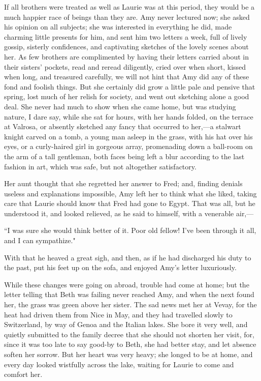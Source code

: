 If all brothers were treated as well as Laurie was at this period, they
would be a much happier race of beings than they are. Amy never lectured
now; she asked his opinion on all subjects; she was interested in
everything he did, made charming little presents for him, and sent him
two letters a week, full of lively gossip, sisterly confidences, and
captivating sketches of the lovely scenes about her. As few brothers are
complimented by having their letters carried about in their
sisters' pockets, read and reread diligently, cried
over when short, kissed when long, and treasured carefully, we will not
hint that Amy did any of these fond and foolish things. But she
certainly did grow a little pale and pensive that spring, lost much of
her relish for society, and went out sketching alone a good deal. She
never had much to show when she came home, but was studying nature, I
dare say, while she sat for hours, with her hands folded, on the terrace
at Valrosa, or absently sketched any fancy that occurred to her,---a
stalwart knight carved on a tomb, a young man asleep in the grass, with
his hat over his eyes, or a curly-haired girl in gorgeous array,
promenading down a ball-room on the arm of a tall gentleman, both faces
being left a blur according to the last fashion in art, which was safe,
but not altogether satisfactory.

Her aunt thought that she regretted her answer to Fred; and, finding
denials useless and explanations impossible, Amy left her to think what
she liked, taking care that Laurie should know that Fred had gone to
Egypt. That was all, but he understood it, and looked relieved, as he
said to himself, with a venerable air,---

``I was sure she would think better of it. Poor old fellow!
I've been through it all, and I can sympathize."

With that he heaved a great sigh, and then, as if he had discharged his
duty to the past, put his feet up on the sofa, and enjoyed
Amy's letter luxuriously.

While these changes were going on abroad, trouble had come at home; but
the letter telling that Beth was failing never reached Amy, and when the
next found her, the grass was green above her sister. The sad news met
her at Vevay, for the heat had driven them from Nice in May, and they
had travelled slowly to Switzerland, by way of Genoa and the Italian
lakes. She bore it very well, and quietly submitted to the family decree
that she should not shorten her visit, for, since it was too late to say
good-by to Beth, she had better stay, and let absence soften her sorrow.
But her heart was very heavy; she longed to be at home, and every day
looked wistfully across the lake, waiting for Laurie to come and comfort
her.

